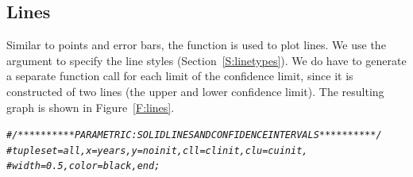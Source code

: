 \documentclass[nojss]{jss}\usepackage[]{graphicx}\usepackage[]{color}
\makeatletter
\newcommand{\hlcom}[1]{\textcolor[rgb]{0.678,0.584,0.686}{\textit{#1}}}%
\newenvironment{kframe}{%
 \def\at@end@of@kframe{}%
 \ifinner\ifhmode%
  \def\at@end@of@kframe{\end{minipage}}%
  \begin{minipage}{\columnwidth}%
 \fi\fi%
 \def\FrameCommand##1{\hskip\@totalleftmargin \hskip-\fboxsep
 \colorbox{shadecolor}{##1}\hskip-\fboxsep
     \hskip-\linewidth \hskip-\@totalleftmargin \hskip\columnwidth}%
 \MakeFramed {\advance\hsize-\width
   \@totalleftmargin\z@ \linewidth\hsize
   \@setminipage}}%
 {\par\unskip\endMakeFramed%
 \at@end@of@kframe}
\newenvironment{knitrout}{}{} %
\makeatother
\begin{document}
\subsection{Lines}\label{S:lines}
Similar to points and error bars, the  function is used to plot lines. We use the  argument to specify the line styles (Section~\ref{S:linetypes}). We do have to generate a separate  function call for each limit of the confidence limit, since it is constructed of two lines (the upper and lower confidence limit). The resulting graph is shown in Figure~\ref{F:lines}.
\begin{knitrout}\footnotesize
{}\color{fgcolor}\begin{kframe}
\begin{alltt}
\hlcom{# /**********PARAMETRIC : SOLID LINES AND CONFIDENCE INTERVALS**********/      }
\hlcom{# tuple set=all, x=years, y=noinit, cll=clinit, clu=cuinit,}
\hlcom{# width=0.5,color=black, end;}


\end{alltt}
\end{kframe}
\end{knitrout}
\end{document}
